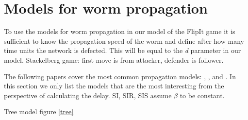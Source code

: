 \begin{description}
\end{description}

 

\section{Models for worm propagation}
\label{modelsforpropagation}
To use the models for worm propagation in our model of the FlipIt game it is sufficient to know the propagation speed of the worm and define after how many time units the network is defected. This will be equal to the \textit{d} parameter in our model.  
Stackelberg game: first move is from attacker, defender is follower. 

The following papers cover the most common propagation models: \cite{wang2014modeling}, \cite{OnWorms2005survey}, \cite{xiang2009propagation} and \cite{serazzi2004computer}.
In this section we only list the models that are the most interesting from the perspective of calculating the delay.
SI, SIR, SIS assume $\beta$ to be constant.

Tree model figure \ref{tree}

